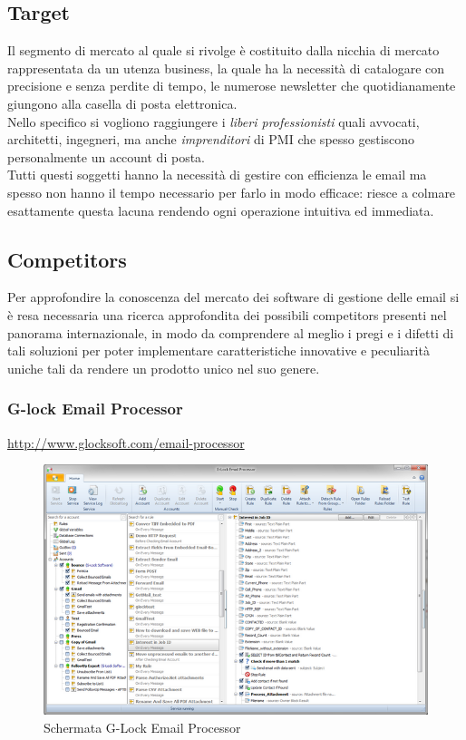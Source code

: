 \subsection{Target}
Il segmento di mercato al quale \NOMEPROGETTO{} si rivolge è costituito dalla nicchia di mercato rappresentata da un utenza business, la quale ha la necessità di catalogare con precisione e senza perdite di tempo, le numerose newsletter che quotidianamente giungono alla casella di posta elettronica.\\
Nello specifico si vogliono raggiungere i \emph{liberi professionisti} quali avvocati, architetti, ingegneri, ma anche \emph{imprenditori} di PMI che spesso gestiscono personalmente un account di posta.\\
Tutti questi soggetti hanno la necessità di gestire con efficienza le email ma spesso non hanno il tempo necessario per farlo in modo efficace: \NOMEPROGETTO{} riesce a colmare esattamente questa lacuna rendendo ogni operazione intuitiva ed immediata.

\subsection{Competitors}
Per approfondire la conoscenza del mercato dei software di gestione delle email si è resa necessaria una ricerca approfondita dei possibili competitors presenti nel panorama internazionale, in modo da comprendere al meglio i pregi e i difetti di tali soluzioni per poter implementare caratteristiche innovative e peculiarità uniche tali da rendere \NOMEPROGETTO{} un prodotto unico nel suo genere.

\subsubsection{G-lock Email Processor} 
\url{http://www.glocksoft.com/email-processor}

\begin{figure}[H]
\centering
\includegraphics[scale=0.5]{img/gep-main-window-1.png}
\caption{Schermata G-Lock Email Processor}
\end{figure}

